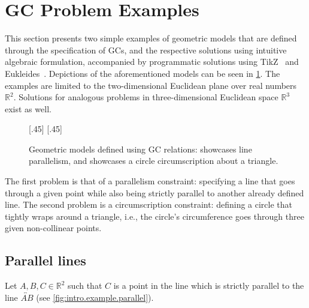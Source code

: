 \section{\Acl{GC} Problem Examples}%
\label{sec:intro.examples}

This section presents two simple examples of geometric models that are defined
through the specification of \acp{GC}, and the respective solutions using
intuitive algebraic formulation, accompanied by programmatic solutions using
\ac{TikZ}~\cite{Tantau:2021:TikZ} and Eukleides~\cite{Obrecht:2010:EM}.
Depictions of the aforementioned models can be seen in \cref{fig:intro.example}.
The examples are limited to the two-dimensional Euclidean plane over real
numbers $\mathbb{R}^2$.  Solutions for analogous problems in three-dimensional
Euclidean space $\mathbb{R}^3$ exist as well.

\begin{figure}[htpb]
    [.45\linewidth]{\resizebox{!}{.2\textheight}{%
      }}
  \hspace{\fill}
    [.45\linewidth]{\resizebox{!}{.2\textheight}{%
      }}
  \caption[Geometric models defined using GCs]{
    Geometric models defined using \ac{GC} relations:
     showcases line parallelism, and
     showcases a circle circumscription
    about a triangle.}\label{fig:intro.example}
\end{figure}

The first problem is that of a parallelism constraint: specifying a line that
goes through a given point while also being strictly parallel to another already
defined line.  The second problem is a circumscription constraint: defining a
circle that tightly wraps around a triangle, i.e., the circle's circumference
goes through three given non-collinear points.

\subsection{Parallel lines}%
\label{sec:intro.examples.parallel}

Let $A, B, C \in \mathbb{R}^2$ such that $C$ is a point in the line which is
strictly parallel to the line $\overleftrightarrow{AB}$ (see
\cref{fig:intro.example.parallel}).

